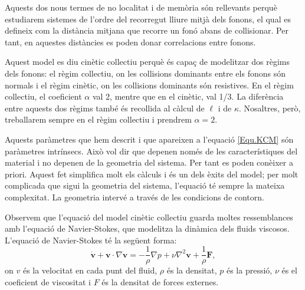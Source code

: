 \documentclass{article}
\begin{document}
Aquests dos nous termes de no localitat i de mem\`{o}ria s\'{o}n rellevants perqu\`{e} estudiarem sistemes de l'ordre del recorregut lliure mitj\`{a} dels fonons, el qual es defineix com la dist\`{a}ncia mitjana que recorre un fon\'{o} abans de col\textperiodcentered lisionar. Per tant, en aquestes dist\`{a}ncies es poden donar correlacions entre fonons.

Aquest model es diu cin\`{e}tic col\textperiodcentered lectiu perqu\`{e} \'{e}s capa\c{c} de modelitzar dos r\`{e}gims dels fonons: el r\`{e}gim col\textperiodcentered lectiu, on les col\textperiodcentered lisions dominants entre els fonons s\'{o}n normals i el r\`{e}gim cin\`{e}tic, on les col\textperiodcentered lisions dominants s\'{o}n resistives. En el r\`{e}gim col\textperiodcentered lectiu, el coeficient $\alpha$ val 2, mentre que en el cin\`{e}tic, val 1/3. La difer\`{e}ncia entre aquests dos r\`{e}gims tamb\'{e} \'{e}s recollida al c\`{a}lcul de $\ell$ i de $\kappa$. Nosaltres, per\`{o}, treballarem sempre en el r\`{e}gim col\textperiodcentered lectiu i prendrem $\alpha=2$.

Aquests par\`{a}metres que hem descrit i que apareixen a l'equaci\'{o} \eqref{Equ.KCM} s\'{o}n par\`{a}metres intr\'{i}nsecs. Aix\`{o} vol dir que depenen nom\'{e}s de les caracter\'{i}stiques del material i no depenen de la geometria del sistema. Per tant es poden con\`{e}ixer a priori. Aquest fet simplifica molt els c\`{a}lculs i \'{e}s un dels \`{e}xits del model; per molt complicada que sigui la geometria del sistema, l'equaci\'{o} t\'{e} sempre la mateixa complexitat. La geometria interv\'{e} a trav\'{e}s de les condicions de contorn.
\vspace{4mm}

Observem que l'equaci\'{o} del model cin\`{e}tic col\textperiodcentered lectiu guarda moltes ressemblances amb l'equaci\'{o} de Navier-Stokes, que modelitza la din\`{a}mica dels fluids viscosos. L'equaci\'{o} de Navier-Stokes t\'{e} la seg\"{u}ent forma:
\begin{equation}\label{Equ.Navier-Stokes}
\dot{\boldsymbol{v}}+\boldsymbol{v}\cdot\nabla\boldsymbol{v}=-\frac{1}{\rho}\nabla p+\nu\nabla^2\boldsymbol{v}+\frac{1}{\rho}\boldsymbol{F},
\end{equation}
on $v$ \'{e}s la velocitat en cada punt del fluid, $\rho$ \'{e}s la densitat, $p$ \'{e}s la pressi\'{o}, $\nu$ \'{e}s el coeficient de viscositat i $F$ \'{e}s la densitat de forces externes.
\end{document}
